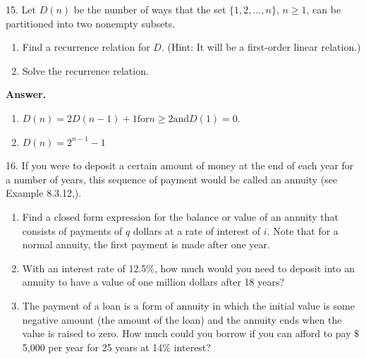\documentclass[10pt,]{book}
\theoremstyle{plain}
\theoremstyle{definition}
\theoremstyle{definition}
\theoremstyle{definition}
\theoremstyle{definition}
\numberwithin{equation}{section}
\begin{document}
\begin{exercisegroup}
\item[15.]\hypertarget{exercise-26}{}Let \(D(n)\) be the number of ways that the set \(\{1, 2, . . . , n\}\), \(n \geq  1\), can be partitioned into two nonempty subsets.%
\par
\leavevmode%
\begin{enumerate}[label=\alph*]
\item\hypertarget{li-82}{}Find a recurrence relation for \(D\). (Hint: It will be a first-order linear relation.)%
\item\hypertarget{li-83}{}Solve the recurrence relation.%
\end{enumerate}
%
\par\smallskip
\par\smallskip
\noindent\textbf{Answer.}\hypertarget{answer-14}{}\quad
\leavevmode%
\begin{enumerate}[label=\alph*]
\item\hypertarget{li-84}{} \(D(n)=2D(n-1)+1 \textrm{for} n \geq 2 \textrm{and} D(1)=0.\)%
\item\hypertarget{li-85}{} \(D(n)=2^{n-1}-1\)%
\end{enumerate}
%
\item[16.]\hypertarget{exercise-27}{}If you were to deposit a certain amount of money at the end of each year for a number of years, this sequence of payment would be called an
annuity (see Example 8.3.12,).%
\par
\leavevmode%
\begin{enumerate}[label=\alph*]
\item\hypertarget{li-86}{}Find a closed form expression for the balance or value of an annuity that consists of payments of \(q\) dollars at a rate of interest
of \(i\). Note that for a normal annuity, the first payment is made after one year.%
\item\hypertarget{li-87}{}With an interest rate of 12.5$\%$, how much would you need to deposit into an annuity to have a value of one million dollars after 18 years?%
\item\hypertarget{li-88}{}The payment of a loan is a form of annuity in which the initial value is some negative amount (the amount of the loan) and the annuity ends
when the value is raised to zero. How much could you borrow if you can afford to pay $\$$5,000 per year for 25 years at 14$\%$ interest?%
\end{enumerate}
%
\par\smallskip
\end{exercisegroup}
\end{document}
